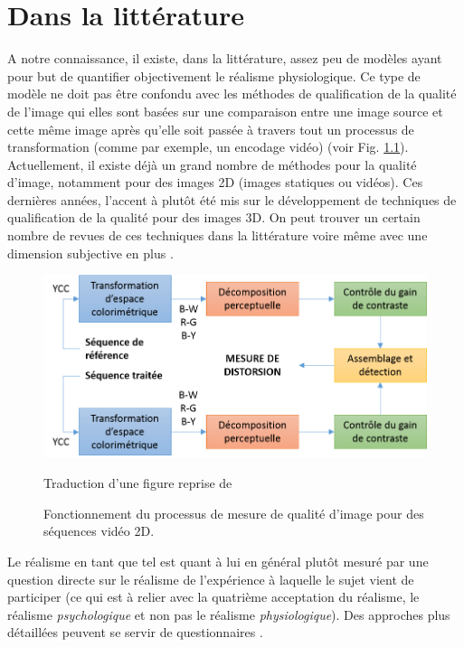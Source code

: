 \chapter{Dans la littérature}	
\par A notre connaissance, il existe, dans la littérature, assez peu de modèles ayant pour but de quantifier objectivement le réalisme physiologique. Ce type de modèle ne doit pas être confondu avec les méthodes de qualification de la qualité de l'image qui elles sont basées sur une comparaison entre une image source et cette même image après qu'elle soit passée à travers tout un processus de transformation (comme par exemple, un encodage vidéo) \citep{cadik_human_2004, winkler_quality_2000} (voir Fig. \ref{fig:quality_process}). Actuellement, il existe déjà un grand nombre de méthodes pour la qualité d'image, notamment pour des images 2D (images statiques ou vidéos). Ces dernières années, l'accent à plutôt été mis sur le développement de techniques de qualification de la qualité pour des images 3D. On peut trouver un certain nombre de revues de ces techniques dans la littérature \citep{moorthy_subjective_2013, moorthy_survey_2013} voire même avec une dimension subjective en plus \citep{beghdadi_survey_2013}.
	
	\begin{figure}
		\centering
		\includegraphics[scale=1]{Figures/ImageQualityWinkler}
		\caption{Fonctionnement du processus de mesure de qualité d'image pour des séquences vidéo 2D.}{Traduction d'une figure reprise de \cite{winkler_quality_2000}}
		\label{fig:quality_process}
	\end{figure}
	
	\par Le réalisme en tant que tel est quant à lui en général plutôt mesuré par une question directe sur le réalisme de l'expérience à laquelle le sujet vient de participer (ce qui est à relier avec la quatrième acceptation du réalisme, le réalisme \textit{psychologique} et non pas le réalisme \textit{physiologique}). Des approches plus détaillées peuvent se servir de questionnaires \citep{fucentese_evaluation_2015, fiard_initial_2014}.
	
